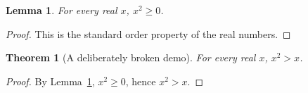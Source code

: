 \documentclass{article}
\newtheorem{theorem}{Theorem}
\newtheorem{lemma}{Lemma}
\begin{document}
\begin{lemma}\label{lem:square}
For every real $x$, $x^2\ge 0$.
\end{lemma}
\begin{proof}
This is the standard order property of the real numbers.
\end{proof}

\begin{theorem}[A deliberately broken demo]\label{thm:bad}
For every real $x$, $x^2>x$.
\end{theorem}
\begin{proof}
By Lemma~\ref{lem:square}, $x^2\ge0$, hence $x^2>x$.
\end{proof}
\end{document}
